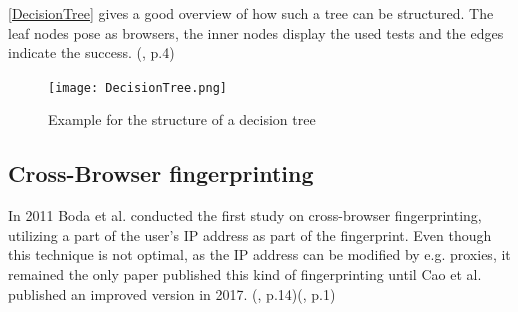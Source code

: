 \autoref{DecisionTree} gives a good overview of how such a tree can be structured. The leaf nodes pose as browsers, the inner nodes display the used tests and the edges indicate the success. (\textcite{mulazzani13}, p.4)
\begin{figure}[H]
	\centering
	\texttt{[image: DecisionTree.png]}
	\caption{Example for the structure of a decision tree}
	\label{DecisionTree}
\end{figure}

\subsection{Cross-Browser fingerprinting}
In 2011 Boda et al. conducted the first study on cross-browser fingerprinting, utilizing a part of the user's IP address as part of the fingerprint. Even though this technique is not optimal, as the IP address can be modified by e.g. proxies, it remained the only paper published this kind of fingerprinting until Cao et al. published an improved version in 2017. (\textcite{boda11}, p.14)(\textcite{Cao17}, p.1)

